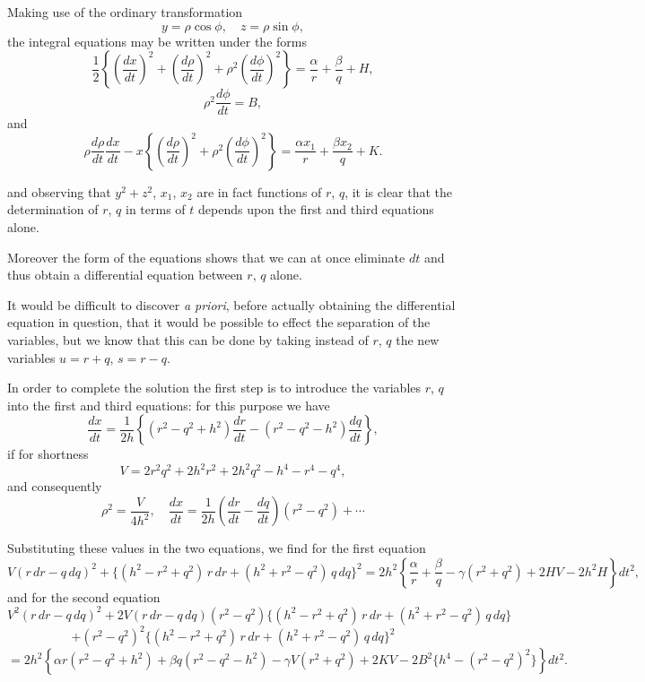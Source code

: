\documentclass[11pt,a4paper]{book}
\begin{document}
\newpage
[182]

Making use of the ordinary transformation
\[
y = \rho \cos \phi, \quad z = \rho \sin \phi,
\]
the integral equations may be written under the forms
\[
\frac{1}{2}\left\{\left(\frac{dx}{dt}\right)^2 + \left(\frac{d\rho}{dt}\right)^2 + \rho^2\left(\frac{d\phi}{dt}\right)^2\right\} = \frac{\alpha}{r} + \frac{\beta}{q} + H, \tag{1, $b$}
\]
\[
\rho^2\frac{d\phi}{dt} = B, \tag{2, $b$}
\]
and
\[
\rho\frac{d\rho}{dt}\frac{dx}{dt} - x\left\{\left(\frac{d\rho}{dt}\right)^2 + \rho^2\left(\frac{d\phi}{dt}\right)^2\right\} = \frac{\alpha x_1}{r} + \frac{\beta x_2}{q} + K. \tag{3, $b$}
\]

and observing that $y^2 + z^2$, $x_1$, $x_2$ are in fact functions of $r$, $q$, it is clear that the determination of $r$, $q$ in terms of $t$ depends upon the first and third equations alone.

Moreover the form of the equations shows that we can at once eliminate $dt$ and thus obtain a differential equation between $r$, $q$ alone.

It would be difficult to discover \textit{a priori}, before actually obtaining the differential equation in question, that it would be possible to effect the separation of the variables, but we know that this can be done by taking instead of $r$, $q$ the new variables $u = r + q$, $s = r - q$.

In order to complete the solution the first step is to introduce the variables $r$, $q$ into the first and third equations: for this purpose we have
\[
\frac{dx}{dt} = \frac{1}{2h}\left\{(r^2 - q^2 + h^2)\frac{dr}{dt} - (r^2 - q^2 - h^2)\frac{dq}{dt}\right\},
\]
if for shortness
\[
V = 2r^2q^2 + 2h^2r^2 + 2h^2q^2 - h^4 - r^4 - q^4,
\]
and consequently
\[
\rho^2 = \frac{V}{4h^2}, \quad \frac{dx}{dt} = \frac{1}{2h}\left(\frac{dr}{dt} - \frac{dq}{dt}\right)(r^2 - q^2) + \cdots
\]

\newpage
[182]

Substituting these values in the two equations, we find for the first equation
\[
V(r\,dr - q\,dq)^2 + \{(h^2 - r^2 + q^2)\,r\,dr + (h^2 + r^2 - q^2)\,q\,dq\}^2 = 2h^2\left\{\frac{\alpha}{r} + \frac{\beta}{q} - \gamma(r^2 + q^2) + 2HV - 2h^2H\right\}dt^2, \tag{1, $c$}
\]
and for the second equation
\[
V^2(r\,dr - q\,dq)^2 + 2V(r\,dr - q\,dq)(r^2 - q^2)\{(h^2 - r^2 + q^2)\,r\,dr + (h^2 + r^2 - q^2)\,q\,dq\}
\]
\[
+ (r^2 - q^2)^2\{(h^2 - r^2 + q^2)\,r\,dr + (h^2 + r^2 - q^2)\,q\,dq\}^2
\]
\[
= 2h^2\left\{\alpha r(r^2 - q^2 + h^2) + \beta q(r^2 - q^2 - h^2) - \gamma V(r^2 + q^2) + 2KV - 2B^2\{h^4 - (r^2 - q^2)^2\}\right\}dt^2. \tag{2, $c$}
\]
\end{document}
